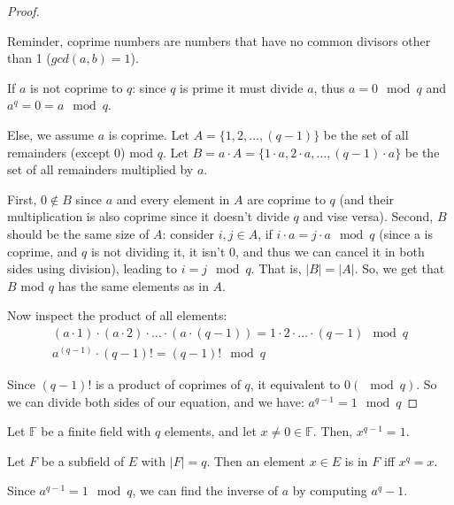 \begin{proof}
    \begin{insight}
        Reminder, coprime numbers are numbers that have no common divisors other than 1 ($gcd(a,b)=1$).
    \end{insight}

    If $a$ is not coprime to $q$: since $q$ is prime it must divide $a$, thus $a=0\mod q$ and $a^q=0=a\mod q$.

    Else, we assume $a$ is coprime. Let $A=\{1,2,\dots,(q-1)\}$ be the set of all remainders (except $0$) mod $q$. 
    Let $B=a\cdot A=\{1 \cdot a, 2\cdot a,\dots,(q-1)\cdot a\}$ be the set of all remainders multiplied by $a$.

    First, $0\notin B$ since $a$ and every element in $A$ are coprime to $q$ (and their multiplication is also coprime since it doesn't divide $q$ and vise versa). Second, $B$ should be the same size of $A$: consider $i,j\in A$,
    if $i\cdot a = j \cdot a \mod q$ (since a is coprime, and $q$ is not dividing it, it isn't $0$, and thus we can cancel it in both sides using division), leading to $i=j \mod q$. That is,  $|B|=|A|$.
    So, we get that $B$ mod $q$ has the same elements as in $A$.

    Now inspect the product of all elements:
    \begin{align}
     (a \cdot 1) \cdot (a \cdot 2) \cdot \dots \cdot (a \cdot (q-1)) = 1 \cdot 2 \cdot \dots \cdot (q-1) \mod q \\
     a^{(q-1)}\cdot (q-1)! = (q-1)! \mod q    
    \end{align}

    Since $(q-1)!$ is a product of coprimes of $q$, it equivalent to $0 (\mod q)$. So we can divide both sides of our equation, and we have: 
    $ a^{q-1} = 1 \mod q$
\end{proof}


\begin{corollary}
    Let $\mathbb{F}$ be a finite field with $q$ elements, and let $x\ne0\in \mathbb{F}$.
    Then, $x^{q-1}=1$.
\end{corollary}


\begin{corollary}
    Let $F$ be a subfield of $E$ with $|F|=q$. Then 
    an element $x\in E$ is in $F$ iff $x^q=x$.
\end{corollary}

\begin{corollary}
    Since $a^{q-1}=1 \mod q$, we can find the inverse of $a$ by computing $a^q-1$.
\end{corollary}


